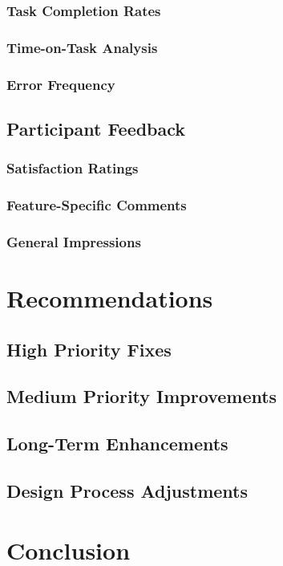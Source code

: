 \documentclass{article}
\begin{document}
\subsubsection{Task Completion Rates}
\subsubsection{Time-on-Task Analysis}
\subsubsection{Error Frequency}

\subsection{Participant Feedback}
\subsubsection{Satisfaction Ratings}
\subsubsection{Feature-Specific Comments}
\subsubsection{General Impressions}


\newpage
\section{Recommendations}
\subsection{High Priority Fixes}
\subsection{Medium Priority Improvements}
\subsection{Long-Term Enhancements}
\subsection{Design Process Adjustments}

\newpage
\section{Conclusion}
\end{document}
